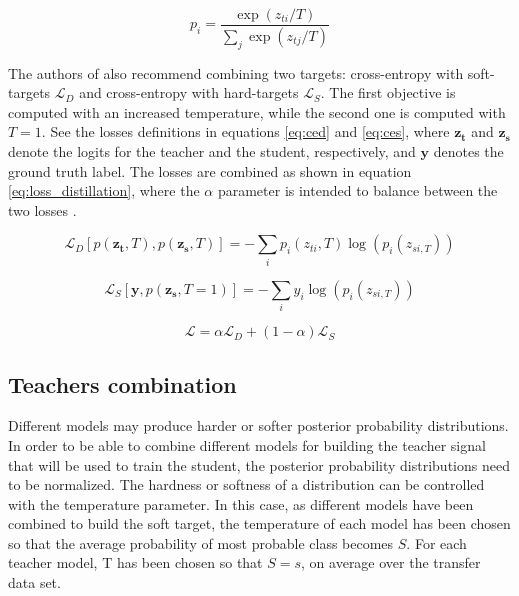 \documentclass{elsarticle}
\begin{document}
	\begin{equation}
	p_{i} = \frac{\exp(z_{ti}/T)}{\sum_j \exp(z_{tj}/T)}
	\label{eq:softmax}
	\end{equation}
	
	The authors of \cite{hinton2015} also recommend combining two targets: cross-entropy with soft-targets $\mathcal{L}_D$ and cross-entropy with hard-targets  $\mathcal{L}_S$. The first objective is computed with an increased temperature, while the second one is computed with $T=1$. See the losses definitions in equations \ref{eq:ced} and \ref{eq:ces}, where $\mathbf{z_t}$ and $\mathbf{z_s}$ denote the logits for the teacher and the student, respectively, and $\mathbf{y}$ denotes the ground truth label. The losses are combined as shown in equation \ref{eq:loss_distillation}, where the $\alpha$ parameter is intended to balance between the two losses \cite{gou2020}.
	
	\begin{equation}
	\mathcal{L}_D\left[p( \mathbf{z_t}, T), p(\mathbf{z_s}, T) \right] = -\sum_i p_i(z_{ti}, T) \log \left(p_i(z_{si, T})\right)
	\label{eq:ced}
	\end{equation}
	
	\begin{equation}
	\mathcal{L}_{S}\left[\mathbf{y}, p(\mathbf{z_s}, T=1) \right] = -\sum_i y_i \log \left(p_i(z_{si, T})\right)
	\label{eq:ces}
	\end{equation}
	
	\begin{equation}
	\mathcal{L} = \alpha \mathcal{L}_D + (1-\alpha) \mathcal{L}_{S}
	\label{eq:loss_distillation}
	\end{equation}
	
	\subsection{Teachers combination} \label{sec:teachers_comb}
	 Different models may produce harder or softer posterior probability distributions. In order to be able to combine  different models for building the teacher signal that will be used to train the student, the posterior probability distributions need to be normalized. The hardness or softness of a distribution can be controlled with the temperature parameter. In this case, as different models have been combined to build the soft target, the temperature of each model has been chosen so that the average probability of most probable class becomes $S$. For each teacher model, T has been chosen so that $S=s$, on average over the transfer data set.
	 
\end{document}
